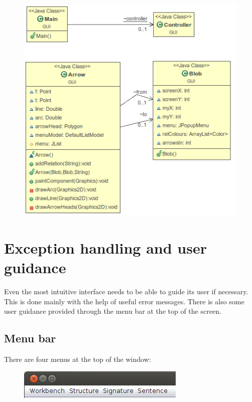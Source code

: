 \documentclass{report}
\begin{document}
\begin{figure}[h!]
\centering \includegraphics[scale=0.7]{gui.png}
\end{figure}

\section{Exception handling and user guidance}
Even the most intuitive interface needs to be able to guide its user if 
necessary. This is done mainly with the help of useful error messages. There is 
also some user guidance provided through the menu bar at the top of the screen. 

\subsection{Menu bar}
There are four menus at the top of the window:

\begin{figure}[h!]
\centering \includegraphics[scale=0.6]{menu.png}
\end{figure}
\end{document}

